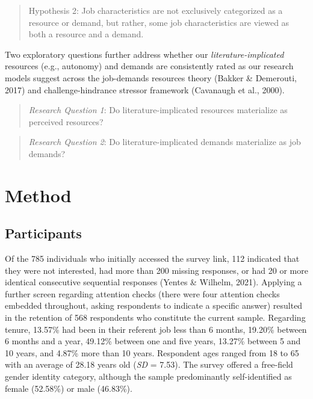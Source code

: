 \documentclass[
  english,
  man]{apa6}
\begin{document}
\begin{quote}
Hypothesis 2: Job characteristics are not exclusively categorized as a resource or demand, but rather, some job characteristics are viewed as both a resource and a demand.
\end{quote}

Two exploratory questions further address whether our \emph{literature-implicated} resources (e.g., autonomy) and demands are consistently rated as our research models suggest across the job-demands resources theory (Bakker \& Demerouti, 2017) and challenge-hindrance stressor framework (Cavanaugh et al., 2000).

\begin{quote}
\emph{Research Question 1}: Do literature-implicated resources materialize as perceived resources?
\end{quote}

\begin{quote}
\emph{Research Question 2}: Do literature-implicated demands materialize as job demands?
\end{quote}

\hypertarget{method}{%
\section{Method}\label{method}}

\hypertarget{participants}{%
\subsection{Participants}\label{participants}}

Of the 785 individuals who initially accessed the survey link, 112 indicated that they were not interested, had more than 200 missing responses, or had 20 or more identical consecutive sequential responses (Yentes \& Wilhelm, 2021). Applying a further screen regarding attention checks (there were four attention checks embedded throughout, asking respondents to indicate a specific answer) resulted in the retention of 568 respondents who constitute the current sample. Regarding tenure, 13.57\% had been in their referent job less than 6 months, 19.20\% between 6 months and a year, 49.12\% between one and five years, 13.27\% between 5 and 10 years, and 4.87\% more than 10 years. Respondent ages ranged from 18 to 65 with an average of 28.18 years old (\emph{SD} = 7.53). The survey offered a free-field gender identity category, although the sample predominantly self-identified as female (52.58\%) or male (46.83\%).
\end{document}
